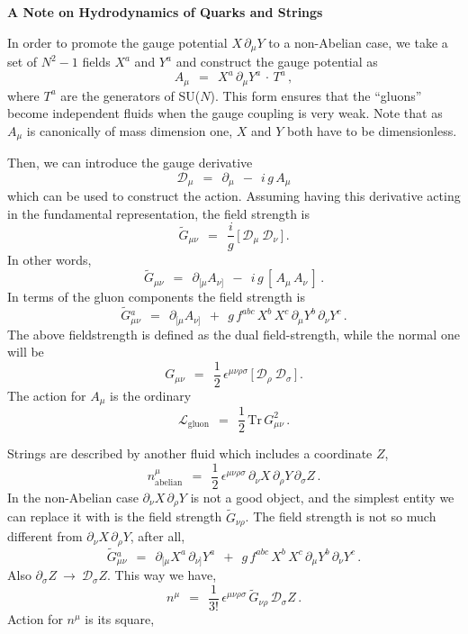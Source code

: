 \documentclass[epsfig,12pt]{article}
\def\beq{\begin{equation}}
\def\eeq{\end{equation}}
\newcommand{\p}{\partial}
\newcommand{\wt}{\widetilde}
\newcommand{\md}{\mathcal{D}}
\newcommand{\ml}{\mathcal{L}}
\newcommand{\Tr}{\text{Tr}}
\begin{document}
\begin{titlepage}


\begin{center}
{  \Large \bf  A Note on Hydrodynamics of Quarks and Strings}
\end{center}

	In order to promote the gauge potential $ X\, \p_\mu Y $ to a non-Abelian case,
	we take a set of $ N^2 - 1 $ fields $ X^a $ and $ Y^a $
	and construct the gauge potential as
\beq
        A_\mu    ~~=~~    X^a\, \p_\mu Y^a\, \cdot\, T^a\,,
\eeq
	where $ T^a $ are the generators of SU($ N $).
	This form ensures that the ``gluons'' become independent fluids when the
	gauge coupling is very weak.
	Note that as $ A_\mu $ is canonically of mass dimension one, $ X $ and $ Y $ both have
	to be dimensionless.

	Then, we can introduce the gauge derivative
\beq
	\md_\mu    ~~=~~   \p_\mu  ~~-~~ i\, g\, A_\mu
\eeq
	which can be used to construct the action.
	Assuming having this derivative acting in the fundamental representation,
        the field strength is
\beq
	\wt G{}_{\mu\nu}    ~~=~~    \frac{i}{g}\, \big[\, \md_\mu~ \md_\nu \,\big]\,.
\eeq
	In other words,
\beq
	\wt G{}_{\mu\nu}    ~~=~~    \p_{[\mu} A_{\nu]} ~~-~~ i\, g\, [\, A_\mu\, A_\nu \,]\,.
\eeq
	In terms of the gluon components the field strength is
\beq
	\wt G{}_{\mu\nu}^a    ~~=~~    \p_{[\mu} A_{\nu]}  ~~+~~
				       g\, f^{abc}\, X^b\, X^c\, \p_\mu Y^b\, \p_\nu Y^c\,.
\eeq
	The above fieldstrength is defined as the dual field-strength, while the normal one will be
\beq
	G_{\mu\nu}    ~~=~~    \frac{1}{2}\, \epsilon^{\mu\nu\rho\sigma}\,
        				     \big[\, \md_\rho~ \md_\sigma \,\big]\,.
\eeq
	The action for $ A_\mu $ is the ordinary
\beq
	\ml_\text{gluon}    ~~=~~    \frac{1}{2}\, \Tr\, G_{\mu\nu}^2\,.
\eeq


	Strings are described by another fluid which includes a coordinate $ Z $,
\beq
        n^\mu_\text{abelian}    ~~=~~    \frac{1}{2}\, \epsilon^{\mu\nu\rho\sigma}\,
						       \p_\nu X\, \p_\rho Y\, \p_\sigma Z\,.
\eeq
	In the non-Abelian case $ \p_\nu X\, \p_\rho Y $ is not a good object,
	and the simplest entity we can replace it with is the field strength $ \wt G{}_{\nu\rho} $.
	The field strength is not so much different from $ \p_\nu X\, \p_\rho Y $, after all,
\beq
	\wt G{}_{\mu\nu}^a    ~~=~~    \p_{[\mu} X^a\, \p_{\nu]} Y^a  ~~+~~
				       g\, f^{abc}\, X^b\, X^c\, \p_\mu Y^b\, \p_\nu Y^c\,.
\eeq
	Also $ \p_\sigma Z ~\longrightarrow~ \md_\sigma Z $.
	This way we have,
\beq
	n^\mu    ~~=~~    \frac{1}{3!}\, \epsilon^{\mu\nu\rho\sigma}\,
					 \wt G{}_{\nu\rho}\, \md_\sigma Z\,.
\eeq
	Action for $ n^\mu $ is its square,


\end{titlepage}
\end{document}
